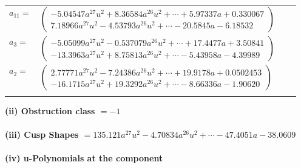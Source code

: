 \documentclass[1p]{elsarticle_modified}
\theoremstyle{definition}
\begin{document}
\begin{tabular}{m{7pt} m{180pt} m{7pt} m{180pt} }
\flushright $a_{11}=$&$\begin{pmatrix}-5.04547 a^{27} u^{2}+8.36584 a^{26} u^{2}+\cdots+5.97337 a+0.330067\\7.18966 a^{27} u^{2}-4.53793 a^{26} u^{2}+\cdots-20.5845 a-6.18532\end{pmatrix}$ \\
\flushright $a_{3}=$&$\begin{pmatrix}-5.05099 a^{27} u^{2}-0.537079 a^{26} u^{2}+\cdots+17.4477 a+3.50841\\-13.3963 a^{27} u^{2}+8.75813 a^{26} u^{2}+\cdots-5.43958 a-4.39989\end{pmatrix}$ \\
\flushright $a_{2}=$&$\begin{pmatrix}2.77771 a^{27} u^{2}-7.24386 a^{26} u^{2}+\cdots+19.9178 a+0.0502453\\-16.1715 a^{27} u^{2}+19.3292 a^{26} u^{2}+\cdots-8.66336 a-1.90620\end{pmatrix}$\\&\end{tabular}
\flushleft \textbf{(ii) Obstruction class $= -1$}\\~\\
\flushleft \textbf{(iii) Cusp Shapes $= 135.121 a^{27} u^{2}-4.70834 a^{26} u^{2}+\cdots-47.4051 a-38.0609$}\\~\\
\newpage\renewcommand{\arraystretch}{1}
\flushleft \textbf{(iv) u-Polynomials at the component}\newline \\
\end{document}
